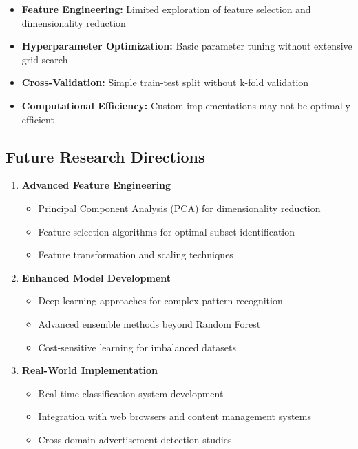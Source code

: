 \begin{itemize}
    \item \textbf{Feature Engineering:} Limited exploration of feature selection and dimensionality reduction
    \item \textbf{Hyperparameter Optimization:} Basic parameter tuning without extensive grid search
    \item \textbf{Cross-Validation:} Simple train-test split without k-fold validation
    \item \textbf{Computational Efficiency:} Custom implementations may not be optimally efficient
\end{itemize}

\subsection{Future Research Directions}

\begin{enumerate}
    \item \textbf{Advanced Feature Engineering}
    \begin{itemize}
        \item Principal Component Analysis (PCA) for dimensionality reduction
        \item Feature selection algorithms for optimal subset identification
        \item Feature transformation and scaling techniques
    \end{itemize}
    
    \item \textbf{Enhanced Model Development}
    \begin{itemize}
        \item Deep learning approaches for complex pattern recognition
        \item Advanced ensemble methods beyond Random Forest
        \item Cost-sensitive learning for imbalanced datasets
    \end{itemize}
    
    \item \textbf{Real-World Implementation}
    \begin{itemize}
        \item Real-time classification system development
        \item Integration with web browsers and content management systems
        \item Cross-domain advertisement detection studies
    \end{itemize}
\end{enumerate}

